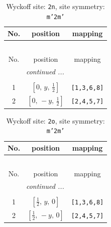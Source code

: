 \documentclass[fleqn,8pt]{jsarticle}
\begin{document}
\begin{longtable}{ccc}
\caption{Wyckoff site: {\tt 2n}, site symmetry: {\tt m'2m'}}
 \\
 \hline \hline
No. & position & mapping \\ \hline \endfirsthead

\multicolumn{2}{l}{\tablename\ \thetable{}} \\
 \hline \hline
No. & position & mapping \\ \hline \endhead

 \hline \hline
\multicolumn{2}{r}{\footnotesize\it continued ...} \\ \endfoot

 \hline \hline
\multicolumn{2}{r}{} \\ \endlastfoot

1 & $\left[ 0,\, y,\, \frac{1}{2} \right]$ & {\tt [1,3,6,8]} \\ \hline
2 & $\left[ 0,\, - y,\, \frac{1}{2} \right]$ & {\tt [2,4,5,7]} \\
\end{longtable}
\renewcommand{\arraystretch}{1.2}
\begin{longtable}{ccc}
\caption{Wyckoff site: {\tt 2o}, site symmetry: {\tt m'2m'}}
 \\
 \hline \hline
No. & position & mapping \\ \hline \endfirsthead

\multicolumn{2}{l}{\tablename\ \thetable{}} \\
 \hline \hline
No. & position & mapping \\ \hline \endhead

 \hline \hline
\multicolumn{2}{r}{\footnotesize\it continued ...} \\ \endfoot

 \hline \hline
\multicolumn{2}{r}{} \\ \endlastfoot

1 & $\left[ \frac{1}{2},\, y,\, 0 \right]$ & {\tt [1,3,6,8]} \\ \hline
2 & $\left[ \frac{1}{2},\, - y,\, 0 \right]$ & {\tt [2,4,5,7]} \\
\end{longtable}
\renewcommand{\arraystretch}{1.2}
\end{document}
